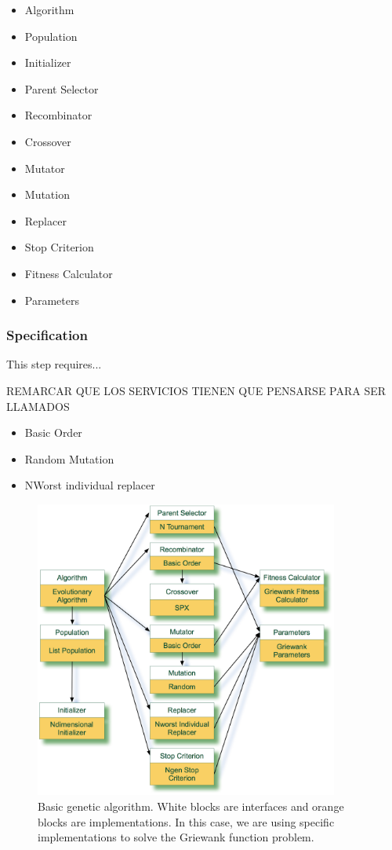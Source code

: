 \begin{itemize}
\item Algorithm
\item Population
\item Initializer
\item Parent Selector
\item Recombinator
\item Crossover
\item Mutator
\item Mutation
\item Replacer
\item Stop Criterion
\item Fitness Calculator
\item Parameters
\end{itemize}

\subsubsection{Specification}

This step requires...

REMARCAR QUE LOS SERVICIOS TIENEN QUE PENSARSE PARA SER LLAMADOS

\begin{itemize}
\item Basic Order
\item Random Mutation
\item NWorst individual replacer
\end{itemize}

\begin{figure}
\centering
\includegraphics[width=10cm]{gfx/soaea/basicga.jpg}
\caption{Basic genetic algorithm. White blocks are interfaces and orange blocks are implementations. In this case, we are using specific implementations to solve the Griewank function problem.}
\label{BASICGAEXAMPLE}
\end{figure}





